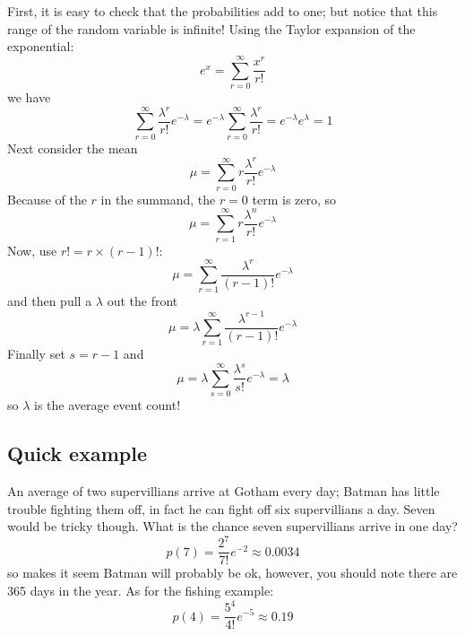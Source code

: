 \documentclass[11pt,a4paper]{scrartcl}
\begin{document}
First, it is easy to check that the probabilities add to one; but
notice that this range of the random variable is infinite!  Using the
Taylor expansion of the exponential:
\begin{equation}
e^x=\sum_{r=0}^\infty \frac{x^r}{r!}
\end{equation}
we have
\begin{equation}
\sum_{r=0}^\infty \frac{\lambda^r}{r!}e^{-\lambda}=e^{-\lambda}\sum_{r=0}^\infty \frac{\lambda^r}{r!}=e^{-\lambda}e^{\lambda}=1
\end{equation}
Next consider the mean
\begin{equation}
\mu = \sum_{r=0}^\infty r\frac{\lambda^r}{r!}e^{-\lambda}
\end{equation}
Because of the $r$ in the summand, the $r=0$ term is zero, so
\begin{equation}
\mu = \sum_{r=1}^\infty r\frac{\lambda^n}{r!}e^{-\lambda}
\end{equation}
Now, use $r!=r\times (r-1)!$:
\begin{equation}
\mu = \sum_{r=1}^\infty \frac{\lambda^r}{(r-1)!}e^{-\lambda}
\end{equation}
and then pull a $\lambda$ out the front
\begin{equation}
\mu = \lambda \sum_{r=1}^\infty \frac{\lambda^{r-1}}{(r-1)!}e^{-\lambda}
\end{equation}
Finally set $s=r-1$ and
\begin{equation}
\mu = \lambda \sum_{s=0}^\infty \frac{\lambda^s}{s!}e^{-\lambda}=\lambda
\end{equation}
so $\lambda$ is the average event count!

\subsection*{Quick example}

An average of two supervillians arrive at Gotham every day; Batman has
little trouble fighting them off, in fact he can fight off six
supervillians a day. Seven would be tricky though. What is the chance
seven supervillians arrive in one day?
\begin{equation}
p(7)=\frac{2^7}{7!}e^{-2}\approx 0.0034
\end{equation}
so makes it seem Batman will probably be ok, however, you should note
there are 365 days in the year. As for the fishing example:
\begin{equation}
p(4)=\frac{5^4}{4!}e^{-5}\approx 0.19
\end{equation}
\end{document}
